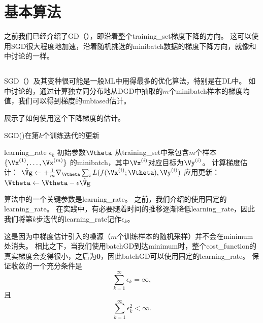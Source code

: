 \section{基本算法}
\label{sec:basic_algorithms}
之前我们已经介绍了\gls{GD}（），即沿着整个\gls{training_set}梯度下降的方向。
这可以使用\gls{SGD}很大程度地加速，沿着随机挑选的\gls{minibatch}数据的梯度下降方向，就像和中讨论的一样。


\subsection{}
\label{sec:stochastic_gradient_descent_chap8}
\gls{SGD}（）及其变种很可能是一般\gls{ML}中用得最多的优化算法，特别是在\gls{DL}中。
如中讨论的，通过计算独立同分布地从\gls{DGD}中抽取的$m$个\gls{minibatch}样本的梯度均值，我们可以得到梯度的\gls{unbiased}估计。


展示了如何使用这个下降梯度的估计。


\begin{algorithm}[ht]
\caption{\gls{SGD}()在第$k$个训练迭代的更新}
\label{alg:sgd}
\begin{algorithmic}
\REQUIRE \gls{learning_rate} $\epsilon_k$
\REQUIRE 初始参数$\Vtheta$
    \STATE 从\gls{training_set}中采包含$m$个样本$\{ \Vx^{(1)},\dots, \Vx^{(m)}\}$ 的\gls{minibatch}，其中$\Vx^{(i)}$对应目标为$\Vy^{(i)}$。
    \STATE 计算梯度估计： $\hat{\Vg} \leftarrow + 
         \frac{1}{m} \nabla_{\Vtheta} \sum_i L(f(\Vx^{(i)};\Vtheta),\Vy^{(i)})$
    \STATE 应用更新：$\Vtheta \leftarrow \Vtheta - \epsilon \hat{\Vg}$
\ENDWHILE
\end{algorithmic}
\end{algorithm}


算法中的一个关键参数是\gls{learning_rate}。
之前，我们介绍的使用固定的\gls{learning_rate}。
在实践中，有必要随着时间的推移逐渐降低\gls{learning_rate}，因此我们将第$k$步迭代的\gls{learning_rate}记作$\epsilon_k$。


这是因为中梯度估计引入的噪源（$m$个训练样本的随机采样）并不会在\gls{minimum}处消失。
相比之下，当我们使用\gls{batch}\gls{GD}到达\gls{minimum}时，整个\gls{cost_function}的真实梯度会变得很小，之后为$\mathbf{0}$，因此\gls{batch}\gls{GD}可以使用固定的\gls{learning_rate}。
保证收敛的一个充分条件是
\begin{equation}
\label{eq:8.12}
    \sum_{k=1}^\infty \epsilon_k = \infty,
\end{equation}
且
\begin{equation}
\label{eq:8.13}
    \sum_{k=1}^\infty \epsilon_k^2 < \infty.
\end{equation}


